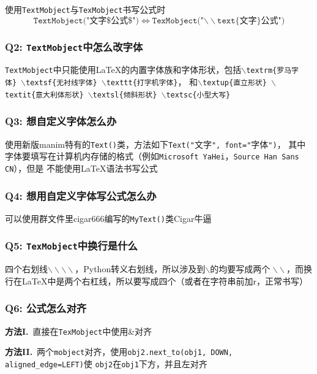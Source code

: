 \documentclass[UTF8]{ctexart}
\begin{document}
使用\texttt{TextMobject}与\texttt{TexMobject}书写公式时
$$
\texttt{TextMobject("}\text{文字}\texttt{\$}\text{公式}\texttt{\$")} \iff \texttt{TexMobject("}\mathtt{\backslash\backslash}
\texttt{text\{}\text{文字}\texttt{\}}\text{公式}\texttt{")}
$$

\subsubsection*{Q2: \texttt{TextMobject}中怎么改字体}
\texttt{TextMobject}中只能使用\LaTeX 的内置字体族和字体形状，包括\texttt{$\backslash$textrm\{罗马字体\}}\ 
\texttt{$\backslash$textsf\{无衬线字体\}}\ \texttt{$\backslash$texttt\{打字机字体\}}，
和\texttt{$\backslash$textup\{直立形状\}}\ \texttt{$\backslash$textit\{意大利体形状\}}\ 
\texttt{$\backslash$textsl\{倾斜形状\}}\ \texttt{$\backslash$textsc\{小型大写\}}

\subsubsection*{Q3: 想自定义字体怎么办}
使用新版manim特有的\texttt{Text()}类，方法如下\texttt{Text("}文字\texttt{", font="}字体\texttt{")}，
其中字体要填写在计算机内存储的格式（例如\texttt{Microsoft YaHei}，\texttt{Source Han Sans CN}），但是
不能使用\LaTeX 语法书写公式

\subsubsection*{Q4: 想用自定义字体写公式怎么办}
可以使用群文件里cigar666编写的\texttt{MyText()}类{\tiny Cigar牛逼}

\subsubsection*{Q5: \texttt{TexMobject}中换行是什么}
四个右划线$\backslash\backslash\backslash\backslash$，Python转义右划线，所以涉及到$\backslash$的均要写成两个
$\backslash\backslash$，而换行在\LaTeX 中是两个右杠线，所以要写成四个（或者在字符串前加r，正常书写）

\subsubsection*{Q6: 公式怎么对齐}
\textbf{方法I.}\ 直接在\texttt{TexMobject}中使用\&对齐

\textbf{方法II.}\ 两个\texttt{mobject}对齐，使用\texttt{obj2.next\_to(obj1, DOWN, aligned\_edge=LEFT)}使
\texttt{obj2}在\texttt{obj1}下方，并且左对齐
\end{document}
